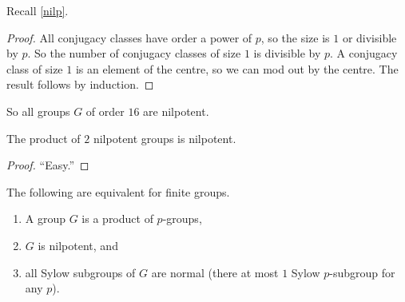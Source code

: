\documentclass[11pt, oneside]{amsart}
\begin{document}
Recall \cref{nilp}. 
\begin{proof}
All conjugacy classes have order a power of $p$, so the size is $1$ or divisible by $p$. So the number of conjugacy classes of size $1$ is divisible by $p$. A conjugacy class of size $1$ is an element of the centre, so we can mod out by the centre. The result follows by induction. 
\end{proof}
So all groups $G$ of order $16$ are nilpotent.
\begin{proposition}
The product of $2$ nilpotent groups is nilpotent. 
\end{proposition}
\begin{proof}
``Easy.''
\end{proof}
\begin{proposition}
The following are equivalent for finite groups. 
\begin{enumerate}
\item A group $G$ is a product of $p$-groups,
\item $G$ is nilpotent, and
\item all Sylow subgroups of $G$ are normal (there at most $1$ Sylow $p$-subgroup for any $p$).
\end{enumerate}
\end{proposition}
%
\end{document}
